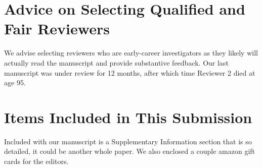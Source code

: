 \documentclass[11pt]{article}
\begin{document}
\section{Advice on Selecting Qualified and Fair Reviewers}
\noindent We advise selecting reviewers who are early-career investigators as they likely will actually read the manuscript and provide substantive feedback. Our last manuscript was under review for 12 months, after which time Reviewer 2 died at age 95.

\section{Items Included in This Submission}
\noindent Included with our manuscript is a Supplementary Information section that is so detailed, it could be another whole paper. We also enclosed a couple amazon gift cards for the editors. 

%


\end{document}
